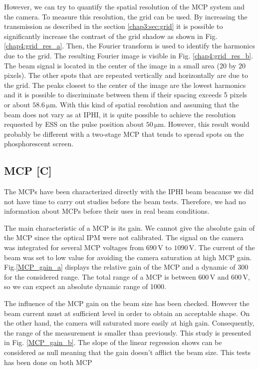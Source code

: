 \begin{refsection}
  However, we can try to quantify the spatial resolution of the MCP system and the camera.
  To measure this resolution, the grid can be used. By increasing the transmission as described in the section \ref{chap3:sec:grid} it is possible to significantly increase the contrast of the grid shadow as shown in Fig. \ref{chap4:grid_res_a}. Then, the Fourier transform is used to identify the harmonics due to the grid. The resulting Fourier image is visible in Fig. \ref{chap4:grid_res_b}. The beam signal is located in the center of the image in a small area ($20$ by $20$ pixels). The other spots that are repeated vertically and horizontally are due to the grid. The peaks closest to the center of the image are the lowest harmonics and it is possible to discriminate between them if their spacing exceeds 5 pixels or about $58.6\,\mathrm{\mu m}$. With this kind of spatial resolution and assuming that the beam does not vary as at IPHI, it is quite possible to achieve the resolution requested by ESS on the pulse position about $50\,\mathrm{\mu m}$. However, this result would probably be different with a two-stage MCP that tends to spread spots on  the phosphorescent screen.

  

  \subsection{MCP [C]}
  The MCPs have been characterized directly with the IPHI beam beacause we did not have time to carry out studies before the beam tests. Therefore, we had no information about MCPs before their uses in real beam conditions.

  The main characteristic of a MCP is its gain. We cannot give the absolute gain of the MCP since the optical IPM were not calibrated. The signal on the camera was integrated for several MCP voltages from $690\,\mathrm{V}$ to $1090\,\mathrm{V}$. The current of the beam was set to low value for avoiding the camera saturation at high MCP gain. Fig.\ref{MCP_gain_a} displays the relative gain of the MCP and a dynamic of $300$ for the considered range. The total range of a MCP is between $600\,\mathrm{V}$ and $600\,\mathrm{V}$, so we can expect an absolute dynamic range of 1000.

  The influence of the MCP gain on the beam size has been checked. However the beam current must at sufficient level in order to obtain an acceptable shape. On the other hand, the camera will  saturated more easily at high gain. Consequently, the range of the measurement is smaller than previously. This study is presented in Fig. \ref{MCP_gain_b}. The slope of the linear regression shows can be considered as null meaning that the gain doesn’t afflict the beam size. This tests has been done on both MCP


\end{refsection}
